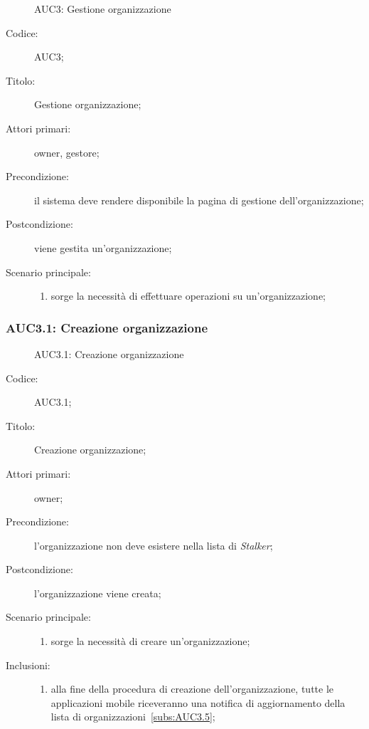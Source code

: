 \documentclass[../../../analisi-dei-requisiti.tex]{subfiles}
\begin{document}
\begin{figure}[H]
  \centering
  \caption{AUC3: Gestione organizzazione}%
  \label{fig:AUC3}
\end{figure}

\begin{description}
  \item[Codice:] AUC3;
  \item[Titolo:] Gestione organizzazione;
  \item[Attori primari:] owner, gestore;
  \item[Precondizione:] il sistema deve rendere disponibile la pagina di gestione dell'organizzazione;
  \item[Postcondizione:] viene gestita un'organizzazione;
  \item[Scenario principale:]
        \begin{enumerate}
          \item sorge la necessità di effettuare operazioni su un'organizzazione;
        \end{enumerate}
\end{description}

\subsubsection{AUC3.1: Creazione organizzazione}%
\label{subs:AUC3.1}

\begin{figure}[H]
  \centering
  \caption{AUC3.1: Creazione organizzazione}%
  \label{fig:AUC3_1}
\end{figure}

\begin{description}
  \item[Codice:] AUC3.1;
  \item[Titolo:] Creazione organizzazione;
  \item[Attori primari:] owner;
  \item[Precondizione:] l'organizzazione non deve esistere nella lista di \emph{Stalker};
  \item[Postcondizione:] l'organizzazione viene creata;
  \item[Scenario principale:]
        \begin{enumerate}
          \item sorge la necessità di creare un'organizzazione;
        \end{enumerate}
  \item[Inclusioni:]
        \begin{enumerate}
          \item alla fine della procedura di creazione dell'organizzazione, tutte le applicazioni mobile riceveranno una notifica di aggiornamento
                della lista di organizzazioni~\ref{subs:AUC3.5};
        \end{enumerate}
\end{description}
\end{document}
